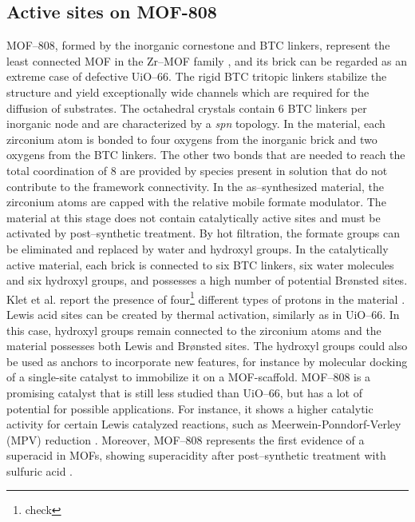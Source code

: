 \subsection{Active sites on MOF-808}
MOF--808, formed by the inorganic  cornestone and BTC linkers, represent the least connected MOF in the Zr--MOF family \cite{furukawa2014water}, and its brick can be regarded as an extreme case of defective UiO--66. The rigid BTC tritopic linkers stabilize the structure and yield exceptionally wide channels which are required for the diffusion of substrates. The octahedral crystals contain 6 BTC linkers per inorganic node and are characterized by a \textit{spn} topology. 
In the material, each zirconium atom is bonded to four oxygens from the inorganic brick and two oxygens from the BTC linkers. The other two bonds that are needed to reach the total coordination of 8 are provided by species present in solution that do not contribute to the framework connectivity. 
\npar
In the as--synthesized material, the zirconium atoms are capped with the relative mobile formate modulator. The material at this stage does not contain catalytically active sites and must be activated by post--synthetic treatment. By hot filtration, the formate groups can be eliminated and replaced by water and hydroxyl groups. In the catalytically active material, each brick is connected to six BTC linkers, six water molecules and six hydroxyl groups, and possesses a high number of potential Br\o{}nsted sites. Klet et al. report the presence of four\footnote{check} different types of protons in the material \cite{klet2016evaluation}. Lewis acid sites can be created by thermal activation, similarly as in UiO--66. In this case, hydroxyl groups remain connected to the zirconium atoms and the material possesses both Lewis and Br\o{}nsted sites. The hydroxyl groups could also be used as anchors to incorporate new features, for instance by molecular docking of a single-site catalyst to immobilize it on a MOF-scaffold. MOF--808 is a promising catalyst that is still less studied than UiO--66, but has a lot of potential for possible applications. For instance, it shows a higher catalytic activity for certain Lewis catalyzed reactions, such as Meerwein-Ponndorf-Verley (MPV) reduction \cite{plessers2016zr, mautschke2018catalytic}. 
Moreover, MOF--808 represents the first evidence of a superacid in MOFs, showing superacidity after post--synthetic treatment with sulfuric acid \cite{jiang2014superacidity}.

